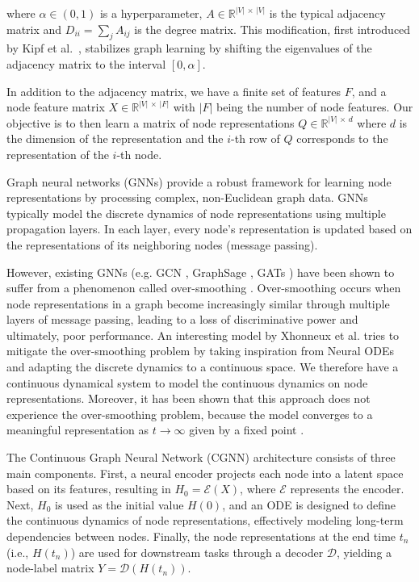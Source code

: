 \documentclass[12pt]{article}
\begin{document}
where $\alpha \in (0,1)$ is a hyperparameter,  $A \in \mathbb{R}^{ |V|\, \times \,|V|}$ is the typical adjacency matrix and $D_{ii} = \sum_{j}A_{ij}$ is the degree matrix. This modification, first introduced by Kipf et al.~\cite{kipf2016semi}, stabilizes graph learning by shifting the eigenvalues of the adjacency matrix to the interval $[0,\alpha]$.

In addition to the adjacency matrix, we have a finite set of features $F$, and a node feature matrix $X \in\mathbb{R}^{ |V|\, \times \, |F|} $ with $|F|$ being the number of node features. Our objective is to then learn a matrix of node representations $Q \in \mathbb{R}^{ |V| \, \times \, d} $ where $d$ is the dimension of the representation and the $i$-th row of $Q$ corresponds to the representation of the $i$-th node.

Graph neural networks (GNNs) \cite{kipf2016semi,velickovic2017graph,hamilton2017inductive} provide a robust framework for learning node representations by processing complex, non-Euclidean graph data. GNNs typically model the discrete dynamics of node representations using multiple propagation layers. In each layer, every node's representation is updated based on the representations of its neighboring nodes (message passing).

However, existing GNNs (e.g. GCN \cite{kipf2016semi}, GraphSage \cite{hamilton2017inductive}, GATs \cite{velickovic2017graph}) have been shown to suffer from a phenomenon called over-smoothing \cite{li2018deeper}. Over-smoothing occurs when node representations in a graph become increasingly similar through multiple layers of message passing, leading to a loss of discriminative power and ultimately, poor performance. An interesting model by Xhonneux et al. \cite{pmlr-v119-xhonneux20a} tries to mitigate the over-smoothing problem by taking inspiration from Neural ODEs \cite{chen2018neural} and adapting the discrete dynamics to a continuous space. We therefore have a continuous dynamical system to model the continuous dynamics on node representations. Moreover, it has been shown that this approach does not experience the over-smoothing problem, because the model converges to a meaningful representation as $t \to \infty$ given by a fixed point \cite{pmlr-v119-xhonneux20a, chamberlain2021grand, poli2019graph}.

The Continuous Graph Neural Network (CGNN) \cite{pmlr-v119-xhonneux20a}  architecture consists of three main components. First, a neural encoder projects each node into a latent space based on its features, resulting in $H_0 = \mathcal{E}(X)$, where $\mathcal{E}$ represents the encoder. Next, $H_0$ is used as the initial value $H(0)$, and an ODE is designed to define the continuous dynamics of node representations, effectively modeling long-term dependencies between nodes. Finally, the node representations at the end time $t_n$ (i.e., $H(t_n)$) are used for downstream tasks through a decoder $\mathcal{D}$, yielding a node-label matrix $Y = \mathcal{D}(H(t_n))$.
\end{document}
